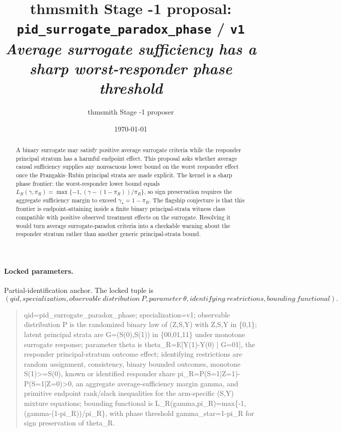 \documentclass[11pt]{article}
\title{thmsmith Stage -1 proposal: \texttt{pid\_surrogate\_paradox\_phase} / \texttt{v1}%
  \\ \large\textit{Average surrogate sufficiency has a sharp worst-responder phase threshold}}
\author{thmsmith Stage -1 proposer}
\date{\today}
\theoremstyle{definition}
\theoremstyle{plain}
\theoremstyle{remark}
\begin{document}
\maketitle


\paragraph{Locked parameters.}
Partial-identification anchor.  The locked tuple is
\[
(qid, specialization, observable\ distribution\ P, parameter\ \theta, identifying\ restrictions, bounding\ functional).
\]
\begin{quote}\small\ttfamily
qid=pid\_surrogate\_paradox\_phase; specialization=v1; observable distribution P is the randomized binary law of (Z,S,Y) with Z,S,Y in \{0,1\}; latent principal strata are G=(S(0),S(1)) in \{00,01,11\} under monotone surrogate response; parameter theta is theta\_R=E[Y(1)-Y(0) | G=01], the responder principal-stratum outcome effect; identifying restrictions are random assignment, consistency, binary bounded outcomes, monotone S(1)>=S(0), known or identified responder share pi\_R=P(S=1|Z=1)-P(S=1|Z=0)>0, an aggregate average-sufficiency margin gamma, and primitive endpoint rank/slack inequalities for the arm-specific (S,Y) mixture equations; bounding functional is L\_R(gamma,pi\_R)=max\{-1,(gamma-(1-pi\_R))/pi\_R\}, with phase threshold gamma\_star=1-pi\_R for sign preservation of theta\_R.
\end{quote}

\begin{abstract}
A binary surrogate may satisfy positive average surrogate criteria while the responder principal stratum has a harmful endpoint effect.  This proposal asks whether average causal sufficiency supplies any nonvacuous lower bound on the worst responder effect once the Frangakis--Rubin principal strata are made explicit.  The kernel is a sharp phase frontier: the worst-responder lower bound equals \(L_R(\gamma,\pi_R)=\max\{-1,(\gamma-(1-\pi_R))/\pi_R\}\), so sign preservation requires the aggregate sufficiency margin to exceed \(\gamma_\star=1-\pi_R\).  The flagship conjecture is that this frontier is endpoint-attaining inside a finite binary principal-strata witness class compatible with positive observed treatment effects on the surrogate.  Resolving it would turn average surrogate-paradox criteria into a checkable warning about the responder stratum rather than another generic principal-strata bound.
\end{abstract}
\end{document}
